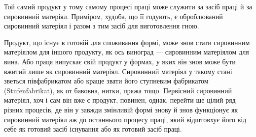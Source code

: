 Той самий продукт у тому самому процесі праці може служити
за засіб праці й за сировинний матеріял. Приміром, худоба,
що її годують, є оброблюваний сировинний матеріял і разом
з тим засіб для виготовлення гною.

Продукт, що існує в готовій для споживання формі, може знов
стати сировинним матеріялом для іншого продукту, як ось виноград
— сировинним матеріялом для вина. Або праця випускає
свій продукт у формах, у яких він знов може бути вжитий лише
як сировинний матеріял. Сировинний матеріял у такому стані
зветься півфабрикатом або краще звати його ступневим фабрикатом
(Stufenfabrikat), як от бавовна, нитки, пряжа тощо.
Первісний сировинний матеріял, хоч і сам він вже є продукт,
повинен, однак, перейти ще цілий ряд різних процесів, де він
у завжди змінливій формі знову й знов функціонує як сировинний
матеріял аж до останнього процесу праці, який відштовхує
його від себе як готовий засіб існування або як готовий засіб праці.
